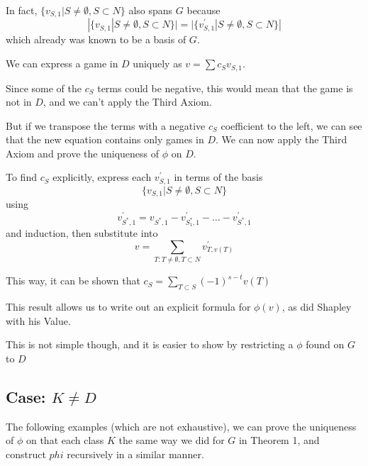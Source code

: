 \documentclass[
paper=128mm:96mm, %
fontsize=11pt, %
pagesize, %
parskip=half-, %
]{scrartcl} %
\theoremstyle{mythmstyle} %
\begin{document}
In fact, $\{v_{S,1} | S \neq \emptyset, S \subset N \}$ also spans $G$ because
\[ |\{v_{S,1} | S \neq \emptyset, S \subset N \}| =
	|\{v^{\prime}_{S,1} | S \neq \emptyset, S \subset N \}| \]
which already was known to be a basis of $G$.


\clearpage

We can express a game in $D$ uniquely as $v = \sum{c_{S}v_{S,1}}$.

Since some of the $c_{S}$ terms could be negative, this would mean that the game is not in $D$, and we can't apply the Third Axiom.

But if we transpose the terms with a negative $c_{S}$ coefficient to the left, we can see that the new equation contains only games in $D$. We can now apply the Third Axiom and prove the uniqueness of $\phi$ on $D$.

\clearpage

To find $c_{S}$ explicitly, express each $v^{\prime}_{S,1}$ in terms of the basis
	\[ \{ v_{S,1} | S \neq \emptyset, S \subset N \} \]
using
	\[ v^{\prime}_{S^{*},1} = v_{S^{*},1} - v^{\prime}_{S^{*}_{1},1} - \dots - v^{\prime}_{S^{*}_{},1} \]
and induction, then substitute into
	\[ v = \sum_{T: T\neq \emptyset, T \subset N}{v^{\prime}_{T, v(T)}} \]
 
This way, it can be shown that $c_{S} = \sum_{T \subset S}{(-1)^{s - t} v(T)}$

\clearpage

This result allows us to write out an explicit formula for $\phi(v)$, as did Shapley with his Value.

This is not simple though, and it is easier to show by restricting a $\phi$ found on $G$ to $D$

\clearpage

\subsection{Case: $K \neq D$}

The following examples (which are not exhaustive), we can prove the uniqueness of $\phi$ on that each class $K$ the same way we did for $G$ in Theorem 1, and construct $phi$ recursively in a similar manner.
\end{document}
